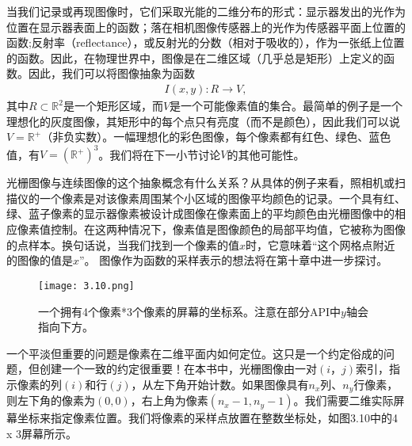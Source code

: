 \documentclass[lang=cn,12pt,marginpar=margintrue]{elegantbook}
\begin{document}
当我们记录或再现图像时，它们采取光能的二维分布的形式：显示器发出的光作为位置在显示器表面上的函数；落在相机图像传感器上的光作为传感器平面上位置的函数;反射率（reflectance），或反射光的分数（相对于吸收的），作为一张纸上位置的函数。因此，在物理世界中，图像是在二维区域（几乎总是矩形）上定义的函数。因此，我们可以将图像抽象为函数
\[
  \begin{aligned}
    I(x,y):R\rightarrow V,
  \end{aligned}
\]
其中$R\subset \mathbb{R} ^2$是一个矩形区域，而$V$是一个可能像素值的集合。最简单的例子是一个理想化的灰度图像，其矩形中的每个点只有亮度（而不是颜色），因此我们可以说$V=\mathbb{R}^{+}$（非负实数）。一幅理想化的彩色图像，每个像素都有红色、绿色、蓝色值，有$V=(\mathbb{R}^{+})^3$。我们将在下一小节讨论$V$的其他可能性。


光栅图像与连续图像的这个抽象概念有什么关系？从具体的例子来看，照相机或扫描仪的一个像素是对该像素周围某个小区域的图像平均颜色的记录。一个具有红、绿、蓝子像素的显示器像素被设计成图像在像素面上的平均颜色由光栅图像中的相应像素值控制。在这两种情况下，像素值是图像颜色的局部平均值，它被称为图像的点样本。换句话说，当我们找到一个像素的值$x$时，它意味着“这个网格点附近的图像的值是$x$”。 图像作为函数的采样表示的想法将在第十章中进一步探讨。

\begin{figure}[htb]
  \centering
  \texttt{[image: 3.10.png]}
  \caption{一个拥有4个像素*3个像素的屏幕的坐标系。注意在部分API中$y$轴会指向下方。}
\end{figure}

一个平淡但重要的问题是像素在二维平面内如何定位。这只是一个约定俗成的问题，但创建一个一致的约定很重要！在本书中，光栅图像由一对$(i，j)$索引，指示像素的列$(i)$和行$(j)$，从左下角开始计数。如果图像具有$n_x$列、$n_y$行像素，则左下角的像素为$(0,0)$，右上角为像素$(n_x-1,n_y-1)$。我们需要二维实际屏幕坐标来指定像素位置。我们将像素的采样点放置在整数坐标处，如图3.10中的4 x 3屏幕所示。
\end{document}
